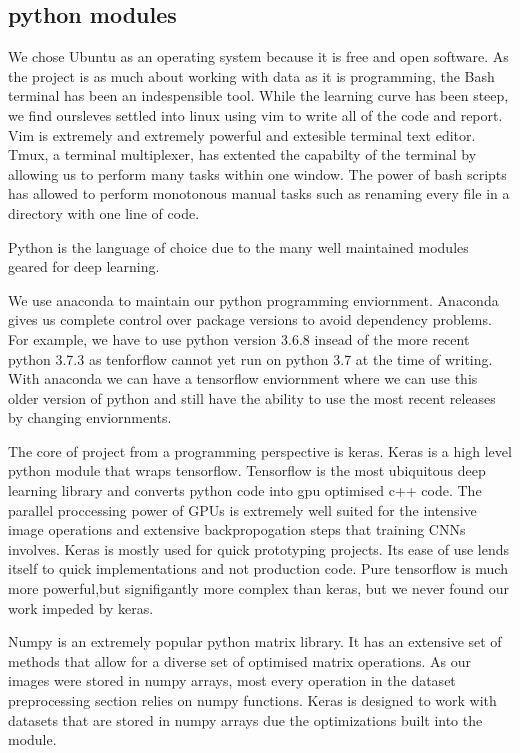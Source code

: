 \documentclass[12pt]{article}
\begin{document}
\subsection{python modules}

We chose Ubuntu as an operating system because it is free and open software.
As the project is as much about working with data as it is programming, the Bash terminal has been an indespensible tool.
While the learning curve has been steep, we find oursleves settled into linux using vim to write all of the code and report.
Vim is extremely and extremely powerful and extesible terminal text editor.
Tmux, a terminal multiplexer, has extented the capabilty of the terminal by allowing us to perform many tasks within one window.
The power of bash scripts has allowed to perform monotonous manual tasks such as renaming every file in a directory with one line of code.
\par
Python is the language of choice due to the many well maintained modules geared for deep learning.
\par
We use anaconda to maintain our python programming enviornment.
Anaconda gives us complete control over package versions to avoid dependency problems.
For example, we have to use python version 3.6.8 insead of the more recent python 3.7.3 as tenforflow cannot yet run on python 3.7 at the time of writing.
With anaconda we can have a tensorflow enviornment where we can use this older version of python and still have the ability to use the most recent releases by changing enviornments.
\par
The core of project from a programming perspective is keras.
Keras is a high level python module that wraps tensorflow.
Tensorflow is the most ubiquitous deep learning library and converts python code into gpu optimised c++ code.
The parallel proccessing power of GPUs is extremely well suited for the intensive image operations and extensive backpropogation steps that training CNNs involves.
Keras is mostly used for quick prototyping projects.
Its ease of use lends itself to quick implementations and not production code.
Pure tensorflow is much more powerful,but signifigantly more complex than keras, but we never found our work impeded by keras.
\par
Numpy is an extremely popular python matrix library.
It has an extensive set of methods that allow for a diverse set of optimised matrix operations.
As our images were stored in numpy arrays, most every operation in the dataset preprocessing section relies on numpy functions.
Keras is designed to work with datasets that are stored in numpy arrays due the optimizations built into the module.
\end{document}
